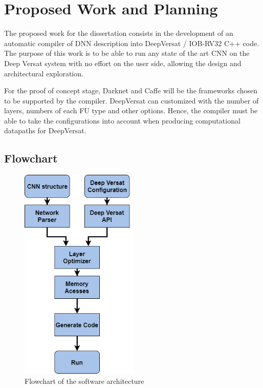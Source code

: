 \chapter{Proposed Work and Planning}
\label{chapter:PWP}

The proposed work for the dissertation consists in the development of an
automatic compiler of DNN description into DeepVersat / IOB-RV32 C++ code. The
purpose of this work is to be able to run any state of the art CNN on the Deep
Versat system with no effort on the user side, allowing the design and
architectural exploration.

For the proof of concept stage, Darknet and Caffe will be the frameworks chosen
to be supported by the compiler. DeepVersat can customized with the number of
layers, numbers of each FU type and other options. Hence, the compiler must be
able to take the configurations into account when producing computational
datapaths for DeepVersat.

\section{Flowchart}

\begin{figure}[!htb]
    \centering
    \includegraphics[width=0.5\textwidth]{Figures/flowchart.png}
    \caption{Flowchart of the software architecture}
    \label{figure:flowchart}
\end{figure}




